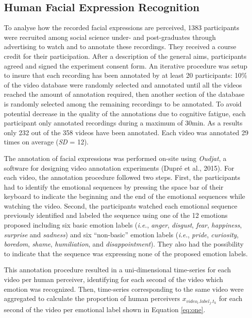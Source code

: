 \documentclass[
  english,
  man]{apa7}
\begin{document}
\hypertarget{human-facial-expression-recognition}{%
\subsection{Human Facial Expression Recognition}\label{human-facial-expression-recognition}}

To analyse how the recorded facial expressions are perceived, 1383 participants were recruited among social science under- and post-graduates through advertising to watch and to annotate these recordings. They received a course credit for their participation. After a description of the general aims, participants agreed and signed the experiment consent form. An iterative procedure was setup to insure that each recording has been annotated by at least 20 participants: 10\% of the video database were randomly selected and annotated until all the videos reached the amount of annotation required, then another section of the database is randomly selected among the remaining recordings to be annotated. To avoid potential decrease in the quality of the annotations due to cognitive fatigue, each participant only annotated recordings during a maximum of 30min. As a results only 232 out of the 358 videos have been annotated. Each video was annotated 29 times on average (\emph{SD} = 12).

The annotation of facial expressions was performed on-site using \emph{Oudjat}, a software for designing video annotation experiments (Dupré et al., 2015). For each video, the annotation procedure followed two steps. First, the participants had to identify the emotional sequences by pressing the space bar of their keyboard to indicate the beginning and the end of the emotional sequences while watching the video. Second, the participants watched each emotional sequence previously identified and labeled the sequence using one of the 12 emotions proposed including six basic emotion labels (\emph{i.e.}, \emph{anger}, \emph{disgust}, \emph{fear}, \emph{happiness}, \emph{surprise} and \emph{sadness}) and six ``non-basic'' emotion labels (\emph{i.e.}, \emph{pride}, \emph{curiosity}, \emph{boredom}, \emph{shame}, \emph{humiliation}, and \emph{disappointment}). They also had the possibility to indicate that the sequence was expressing none of the proposed emotion labels.

This annotation procedure resulted in a uni-dimensional time-series for each video per human perceiver, identifying for each second of the video which emotion was recognized. Then, time-series corresponding to the same video were aggregated to calculate the proportion of human perceivers \(x_{video_{i}.label_{j}.t_{k}}\) for each second of the video per emotional label shown in Equation \eqref{eq:one}.
\end{document}
